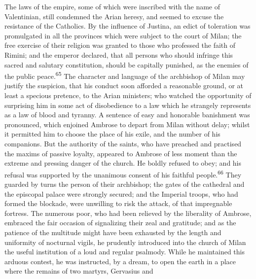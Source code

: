 
The laws of the empire, some of which were inscribed with the
name of Valentinian, still condemned the Arian heresy, and seemed
to excuse the resistance of the Catholics. By the influence of
Justina, an edict of toleration was promulgated in all the
provinces which were subject to the court of Milan; the free
exercise of their religion was granted to those who professed the
faith of Rimini; and the emperor declared, that all persons who
should infringe this sacred and salutary constitution, should be
capitally punished, as the enemies of the public peace.\textsuperscript{65} The
character and language of the archbishop of Milan may justify the
suspicion, that his conduct soon afforded a reasonable ground, or
at least a specious pretence, to the Arian ministers; who watched
the opportunity of surprising him in some act of disobedience to
a law which he strangely represents as a law of blood and
tyranny. A sentence of easy and honorable banishment was
pronounced, which enjoined Ambrose to depart from Milan without
delay; whilst it permitted him to choose the place of his exile,
and the number of his companions. But the authority of the
saints, who have preached and practised the maxims of passive
loyalty, appeared to Ambrose of less moment than the extreme and
pressing danger of the church. He boldly refused to obey; and his
refusal was supported by the unanimous consent of his faithful
people.\textsuperscript{66} They guarded by turns the person of their archbishop;
the gates of the cathedral and the episcopal palace were strongly
secured; and the Imperial troops, who had formed the blockade,
were unwilling to risk the attack, of that impregnable fortress.
The numerous poor, who had been relieved by the liberality of
Ambrose, embraced the fair occasion of signalizing their zeal and
gratitude; and as the patience of the multitude might have been
exhausted by the length and uniformity of nocturnal vigils, he
prudently introduced into the church of Milan the useful
institution of a loud and regular psalmody. While he maintained
this arduous contest, he was instructed, by a dream, to open the
earth in a place where the remains of two martyrs, Gervasius and
